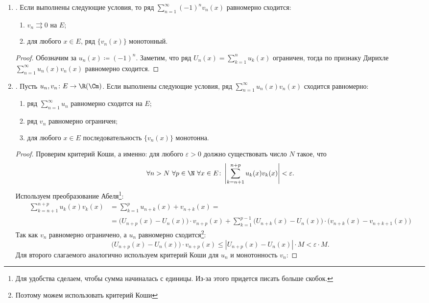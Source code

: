 \begin{prop}
\begin{enumerate}
		\item {}. Если выполнены следующие условия, то ряд $ \sum_{n=1}^{\infty} (-1)^{n}v_n(x)$ равномерно сходится:
			\begin{enumerate}[noitemsep]
				\item $ v_n \rightrightarrows 0$ на $ E$;
				\item для любого $ x \in E$, ряд $ \{v_n(x)\}$ монотонный.
			\end{enumerate}
			\begin{proof}
				Обозначим за $ u_n(x) \coloneqq (-1)^{n}$. Заметим, что ряд $ U_n(x) = \sum_{k=1}^{n} u_k(x)$ ограничен, тогда по признаку Дирихле $ \sum_{n=1}^{\infty} u_n(x)v_n(x)$ равномерно сходится.
			\end{proof}
		\item {}.  Пусть $ u_n, v_n \colon E \to \R(\Cm)$. Если выполнены следующие условия, ряд $ \sum_{n=1}^{\infty} u_n(x)v_n(x)$ сходится равномерно:
			\begin{enumerate}[noitemsep]
				\item ряд $ \sum_{n=1}^{\infty} u_n$ равномерно сходится на $ E$;
				\item ряд $ v_n$ равномерно ограничен;
				\item для любого $ x \in E$ последовательность $ \{v_n(x)\}$ монотонна.
			\end{enumerate}
			\begin{proof}
				Проверим критерий Коши, а именно: для любого $ \varepsilon >0$ должно существовать число $ N$ такое, что
				\[
					\forall n > N ~ \forall p \in \N ~ \forall x \in E\colon \left|   \sum_{k=n+1}^{n+p} u_k(x)v_k(x)  \right| < \varepsilon
				.\]
				Используем преобразование Абеля\footnote{Для удобства сделаем, чтобы сумма начиналась с единицы. Из-за этого придется писать больше скобок.}:
				\[
					\begin{aligned}
						\sum_{k=n+1}^{n+p}u_k (x)v_k(x) &= \sum_{k=1}^{p} u_{n+k}(x) + v_{n+k}(x) =\\
														&= \bigl( U_{n+p}(x) - U_{n}(x) \bigr)\cdot  v_{n+p}(x) + \sum_{k=1}^{p-1} \bigl( U_{n+k}(x) - U_n(x) \bigr) \cdot \bigl( v_{n+k}(x)-v_{n+k+1}(x) \bigr)
					\end{aligned}
				\]
				Так как $ v_n$ равномерно ограничено, а $ u_n $ равномерно сходится\footnote{Поэтому можем использовать критерий Коши}:
				\[
					\bigl(U_{n+p}(x) - U_n(x)\bigr)\cdot v_{n+p}(x) \le \left| U_{n+p}(x) - U_n(x) \right| \cdot M < \varepsilon \cdot M
				.\]
				Для второго слагаемого аналогично используем критерий Коши для $ u_n$ и монотонность  $ v_n$:

\end{proof}
\end{enumerate}
\end{prop}
